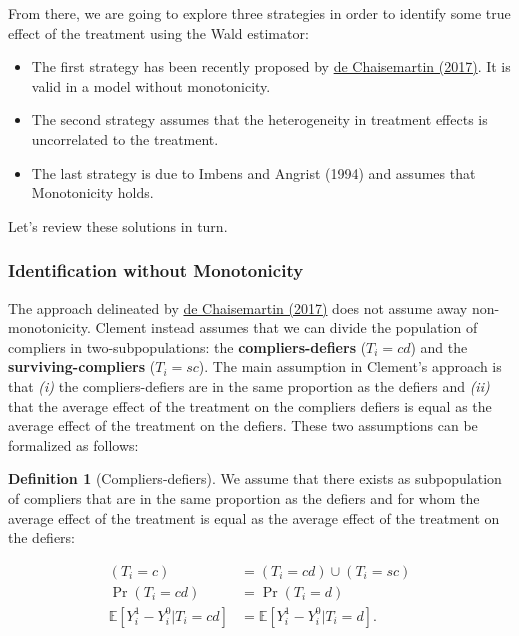 \documentclass[
]{book}
\providecommand{\tightlist}{%
  \setlength{\itemsep}{0pt}\setlength{\parskip}{0pt}}
\newcommand{\esp}[1]{\mathbb{E}[ #1 ]}
\theoremstyle{definition}
\newtheorem{definition}{Definition}[chapter]
\theoremstyle{definition}
\theoremstyle{definition}
\theoremstyle{definition}
\theoremstyle{remark}
\begin{document}
From there, we are going to explore three strategies in order to identify some true effect of the treatment using the Wald estimator:

\begin{itemize}
\tightlist
\item
  The first strategy has been recently proposed by \href{https://drive.google.com/file/d/16XWlDECIvreM7l_NHe-JkXgyuPhFT1QG/view}{de Chaisemartin (2017)}.
  It is valid in a model without monotonicity.
\item
  The second strategy assumes that the heterogeneity in treatment effects is uncorrelated to the treatment.
\item
  The last strategy is due to Imbens and Angrist (1994) and assumes that Monotonicity holds.
\end{itemize}

Let's review these solutions in turn.

\hypertarget{identification-without-monotonicity}{%
\subsubsection{Identification without Monotonicity}\label{identification-without-monotonicity}}

The approach delineated by \href{https://drive.google.com/file/d/16XWlDECIvreM7l_NHe-JkXgyuPhFT1QG/view}{de Chaisemartin (2017)} does not assume away non-monotonicity.
Clement instead assumes that we can divide the population of compliers in two-subpopulations: the \textbf{compliers-defiers} (\(T_i=cd\)) and the \textbf{surviving-compliers} (\(T_i=sc\)).
The main assumption in Clement's approach is that \emph{(i)} the compliers-defiers are in the same proportion as the defiers and \emph{(ii)} that the average effect of the treatment on the compliers defiers is equal as the average effect of the treatment on the defiers.
These two assumptions can be formalized as follows:

\begin{definition}[Compliers-defiers]
\protect\hypertarget{def:CD}{}{\label{def:CD} \iffalse (Compliers-defiers) \fi{} }We assume that there exists as subpopulation of compliers that are in the same proportion as the defiers and for whom the average effect of the treatment is equal as the average effect of the treatment on the defiers:

\begin{align*}
(T_i=c) & = (T_i=cd)\cup (T_i=sc) \\
\Pr(T_i=cd) & = \Pr(T_i=d) \\
\esp{Y^1_i-Y^0_i|T_i=cd} & = \esp{Y^1_i-Y^0_i|T_i=d}.
\end{align*}
\end{definition}
\end{document}
